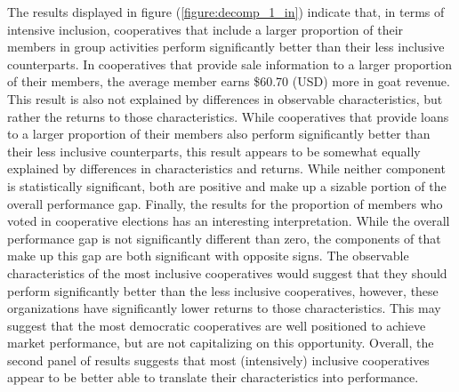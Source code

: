 \documentclass[11pt]{article}
\begin{document}
The results displayed in figure (\ref{figure:decomp_1_in}) indicate that, in terms of intensive inclusion, cooperatives that include a larger proportion of their members in group activities perform significantly better than their less inclusive counterparts. In cooperatives that provide sale information to a larger proportion of their members, the average member earns \$60.70 (USD) more in goat revenue. This result is also not explained by differences in observable characteristics, but rather the returns to those characteristics. While cooperatives that provide loans to a larger proportion of their members also perform significantly better than their less inclusive counterparts, this result appears to be somewhat equally explained by differences in characteristics and returns. While neither component is statistically significant, both are positive and make up a sizable portion of the overall performance gap. Finally, the results for the proportion of members who voted in cooperative elections has an interesting interpretation. While the overall performance gap is not significantly different than zero, the components of that make up this gap are both significant with opposite signs. The observable characteristics of the most inclusive cooperatives would suggest that they should perform significantly better than the less inclusive cooperatives, however, these organizations have significantly lower returns to those characteristics. This may suggest that the most democratic cooperatives are well positioned to achieve market performance, but are not capitalizing on this opportunity. Overall, the second panel of results suggests that most (intensively) inclusive cooperatives appear to be better able to translate their characteristics into performance.  
\end{document}
